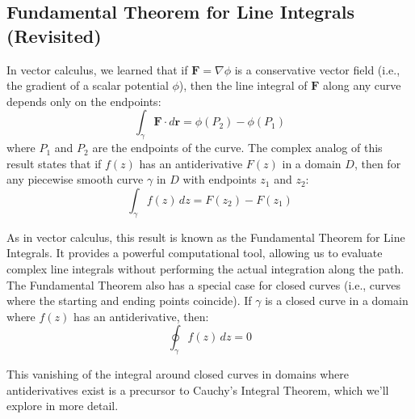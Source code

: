 \subsection*{Fundamental Theorem for Line Integrals (Revisited)} 

\noindent In vector calculus, we learned that if $\mathbf{F} = \nabla \phi$ is a conservative vector field (i.e., the gradient of a scalar potential $\phi$), then the line integral of $\mathbf{F}$ along any curve depends only on the endpoints:
\[
\int_{\gamma} \mathbf{F} \cdot d\mathbf{r} = \phi(P_2) - \phi(P_1)
\]
where $P_1$ and $P_2$ are the endpoints of the curve. The complex analog of this result states that if $f(z)$ has an antiderivative $F(z)$ in a domain $D$, then for any piecewise smooth curve $\gamma$ in $D$ with endpoints $z_1$ and $z_2$:
\[
\int_{\gamma} f(z) \, dz = F(z_2) - F(z_1)
\]

\noindent As in vector calculus, this result is known as the Fundamental Theorem for Line Integrals. It provides a powerful computational tool, allowing us to evaluate complex line integrals without performing the actual integration along the path. The Fundamental Theorem also has a special case for closed curves (i.e., curves where the starting and ending points coincide). If $\gamma$ is a closed curve in a domain where $f(z)$ has an antiderivative, then:
\[
\oint_{\gamma} f(z) \, dz = 0
\]

\noindent This vanishing of the integral around closed curves in domains where antiderivatives exist is a precursor to Cauchy's Integral Theorem, which we'll explore in more detail.


